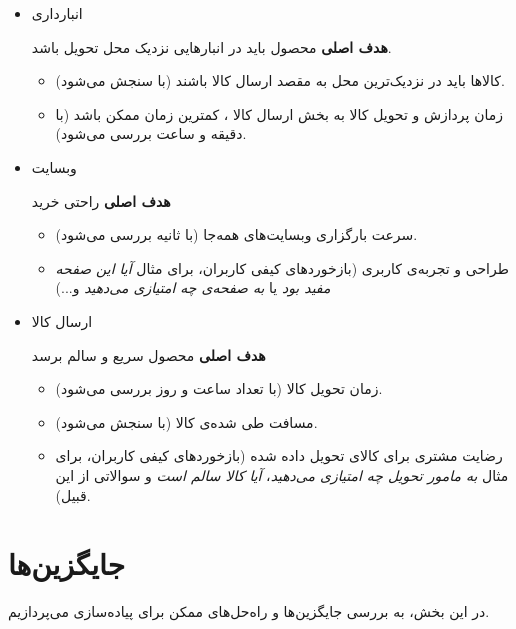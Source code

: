 \documentclass[12pt, dvipsnames, svgnames, x11names,]{article}
\begin{document}
\begin{itemize}
    \item  انبارداری 
    
    \textbf{هدف اصلی} محصول باید در انبار‌هایی نزدیک محل تحویل باشد.
    \begin{itemize}
        \item 
        کالا‌ها باید در نزدیک‌ترین محل به مقصد ارسال کالا باشند (با سنجش می‌شود).
        
        \item 
        زمان پردازش و تحویل کالا به بخش ارسال کالا ، کمترین زمان ممکن باشد (با دقیقه و ساعت بررسی می‌شود).        
    \end{itemize}
    
    \item وبسایت  
    
    \textbf{هدف اصلی} راحتی خرید
    \begin{itemize}
        \item سرعت بارگزاری وبسایت‌های  همه‌جا (با ثانیه بررسی می‌شود).
        
        \item 
        طراحی و تجربه‌ی کاربری  (بازخورد‌های کیفی کاربران، برای مثال \textit{آیا این صفحه مفید بود} یا \textit{به صفحه‌ی  چه امتیازی می‌دهید} و...)
    \end{itemize}

    \item ارسال کالا 
    
    \textbf{هدف اصلی} محصول سریع و سالم برسد
    \begin{itemize}
        \item 
        زمان تحویل کالا (با تعداد ساعت و روز بررسی می‌شود).
        \item 
        مسافت طی شده‌ی کالا (با  سنجش می‌شود).
        
        \item 
        رضایت مشتری برای کالای تحویل داده شده (بازخورد‌های کیفی کاربران، برای مثال 
        \textit{به مامور تحویل چه امتیازی می‌دهید}،
        \textit{آیا کالا سالم است} و سوالاتی از این قبیل).
    \end{itemize}
\end{itemize}


\section{جایگزین‌ها}
در این بخش، به بررسی جایگزین‌ها و راه‌حل‌های ممکن برای پیاده‌سازی  می‌پردازیم.
\end{document}
